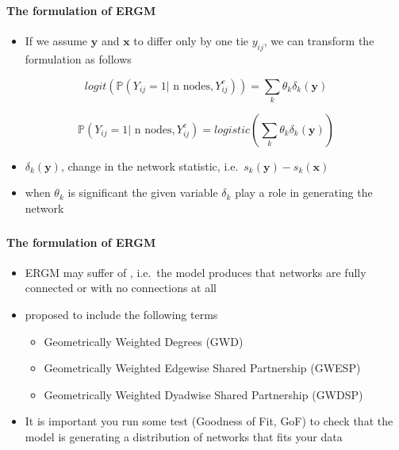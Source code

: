 \documentclass[8pt]{beamer}
\begin{document}

\begin{frame}
\frametitle{\insertsection}
\framesubtitle{The formulation of ERGM}

\begin{itemize}
\item If we assume $\mathbf{y}$ and $\mathbf{x}$ to differ only by one tie $y_{ij}$, we can transform the formulation as follows \cite{Hunter2008}
\end{itemize}

\begin{equation*}
logit\left(\mathbb{P}(Y_{ij} = 1 \vert \text{ n nodes}, Y_{ij}^c)\right) = \sum_k \theta_k \delta_k(\mathbf{y})
\end{equation*}

\begin{equation*}
\mathbb{P}(Y_{ij} = 1 \vert \text{ n nodes}, Y_{ij}^c) = logistic\left(\sum_k \theta_k \delta_k(\mathbf{y})\right)
\end{equation*}

\begin{itemize}
\item $\delta_k(\mathbf{y})$, change in the network statistic, i.e.\ $s_k(\mathbf{y})-s_k(\mathbf{x})$
\item when $\theta_k$ is significant the given variable $\delta_k$ play a role in generating the network
\end{itemize}

\end{frame}


\begin{frame}
\frametitle{\insertsection}
\framesubtitle{The formulation of ERGM}

\begin{itemize}
\item ERGM may suffer of {\color{blue}{degeneracy}}, i.e.\ the model produces that networks are fully connected or with no connections at all
\item \cite{Snijders2006, Hunter2007} proposed to include the following terms
	\begin{itemize}
	\item Geometrically Weighted Degrees (GWD)
	\item Geometrically Weighted Edgewise Shared Partnership (GWESP)
	\item Geometrically Weighted Dyadwise Shared Partnership (GWDSP)
	\end{itemize}
\item It is important you run some test (Goodness of Fit, GoF) to check that the model is generating a distribution of networks that fits your data
\end{itemize}

\end{frame}
\end{document}
